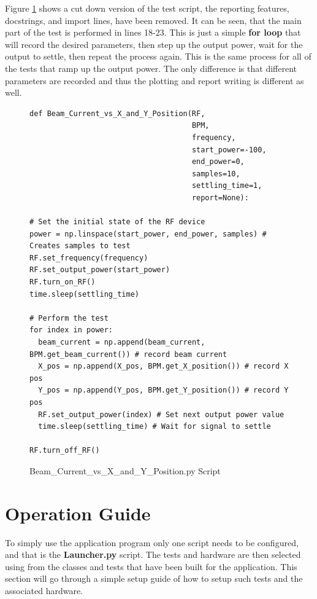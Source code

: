 \documentclass[a4paper, 11pt]{article}
\begin{document}
Figure \ref{fig:BeamCurrentVsXY.py} shows a cut down version of the test script, the reporting features, docstrings, and import lines, have been removed. It can be seen, that the main part of the test is performed in lines 18-23. This is just a simple \textbf{for loop} that will record the desired parameters, then step up the output power, wait for the output to settle, then repeat the process again. This is the same process for all of the tests that ramp up the output power. The only difference is that different parameters are recorded and thus the plotting and report writing is different as well.  

\begin{figure}[H]
\begin{verbatim}
def Beam_Current_vs_X_and_Y_Position(RF,
                                     BPM,
                                     frequency,
                                     start_power=-100,
                                     end_power=0,
                                     samples=10,
                                     settling_time=1,
                                     report=None):
                                     
# Set the initial state of the RF device
power = np.linspace(start_power, end_power, samples) # Creates samples to test
RF.set_frequency(frequency)
RF.set_output_power(start_power)
RF.turn_on_RF()
time.sleep(settling_time)

# Perform the test
for index in power:
  beam_current = np.append(beam_current, BPM.get_beam_current()) # record beam current
  X_pos = np.append(X_pos, BPM.get_X_position()) # record X pos
  Y_pos = np.append(Y_pos, BPM.get_Y_position()) # record Y pos
  RF.set_output_power(index) # Set next output power value
  time.sleep(settling_time) # Wait for signal to settle
 
RF.turn_off_RF()
\end{verbatim}
\caption{Beam\_Current\_vs\_X\_and\_Y\_Position.py Script}
\label{fig:BeamCurrentVsXY.py}
\end{figure}


\section{Operation Guide}
To simply use the application program only one script needs to be configured, and that is the \textbf{Launcher.py} script. The tests and hardware are then selected using from the classes and tests that have been built for the application. This section will go through a simple setup guide of how to setup such tests and the associated hardware. 
\end{document}
